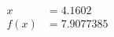 \documentclass[preview]{standalone}
\begin{document}
\begin{align*}
x &= 4.1602\\f(x) &= 7.9077385
\end{align*}
\end{document}
